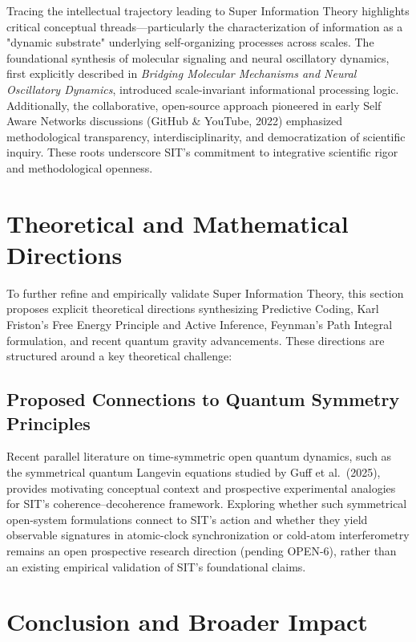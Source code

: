 \documentclass[american,11pt,letterpaper]{article}
\def\texttt#1{#1}%
\begin{document}
Tracing the intellectual trajectory leading to Super Information Theory highlights critical conceptual threads---particularly the characterization of information as a "dynamic substrate" underlying self-organizing processes across scales. The foundational synthesis of molecular signaling and neural oscillatory dynamics, first explicitly described in \textit{Bridging Molecular Mechanisms and Neural Oscillatory Dynamics}, introduced scale-invariant informational processing logic. Additionally, the collaborative, open-source approach pioneered in early Self Aware Networks discussions (GitHub \& YouTube, 2022) emphasized methodological transparency, interdisciplinarity, and democratization of scientific inquiry. These roots underscore SIT's commitment to integrative scientific rigor and methodological openness.

\section{Theoretical and Mathematical Directions}

To further refine and empirically validate Super Information Theory, this section proposes explicit theoretical directions synthesizing Predictive Coding, Karl Friston's Free Energy Principle and Active Inference, Feynman's Path Integral formulation, and recent quantum gravity advancements. These directions are structured around a key theoretical challenge:

\subsection{Proposed Connections to Quantum Symmetry Principles}

Recent parallel literature on time-symmetric open quantum dynamics, such as the symmetrical quantum Langevin equations studied by Guff et al.~(2025), provides motivating conceptual context and prospective experimental analogies for SIT's coherence--decoherence framework. Exploring whether such symmetrical open-system formulations connect to SIT's action and whether they yield observable signatures in atomic-clock synchronization or cold-atom interferometry remains an open prospective research direction (pending \texttt{OPEN-6}), rather than an existing empirical validation of SIT's foundational claims.

\section{Conclusion and Broader Impact}
\label{sec:conclusion-impact}
\end{document}
